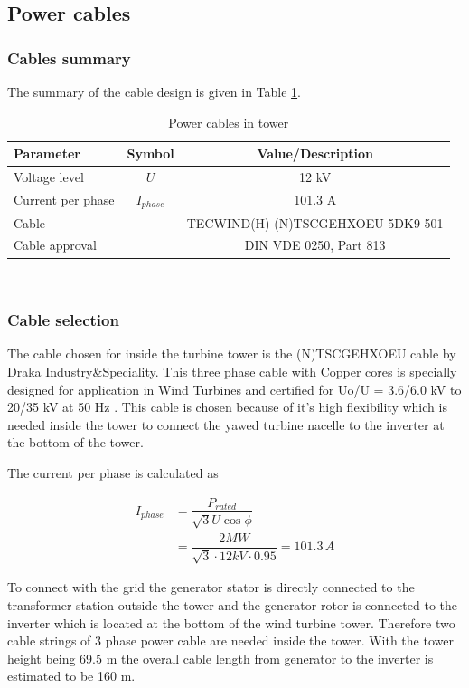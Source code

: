\subsection{Power cables}

\subsubsection{Cables summary}
The summary of the cable design is given in Table \ref{tab:power_cables}.

\begin{table}[h]
\centering
\caption{Power cables in tower}
\label{tab:power_cables}
\begin{tabular}{ |l|c|c|} 
\hline
\textbf{Parameter} & Symbol & \textbf{Value/Description}  \\ 
\hline
Voltage level & $U$ & 12 kV\\
\hline
Current per phase & $I_{phase}$ & 101.3 A\\
\hline
Cable & & TECWIND(H) (N)TSCGEHXOEU 5DK9 501  \\
\hline
Cable approval & & DIN VDE 0250, Part 813 \\
\hline
\end{tabular} \\
\end{table}

\subsubsection{Cable selection}

The cable chosen for inside the turbine tower is the (N)TSCGEHXOEU cable by Draka Industry\&Speciality. This three phase cable with Copper cores is specially designed for application in Wind Turbines and certified for  Uo/U = 3.6/6.0 kV to 20/35 kV at 50 Hz \cite{Draka}. This cable is chosen because of it's high flexibility which is needed inside the tower to connect the yawed turbine nacelle to the inverter at the bottom of the tower.

The current per phase is calculated as

\begin{align}
    I_{phase} &= \dfrac{P_{rated}}{\sqrt{3}U \cos \phi} \\
    &= \dfrac{2 MW}{\sqrt{3} \cdot 12 kV \cdot 0.95} = 101.3\,A \nonumber
\end{align}

To connect with the grid the generator stator is directly connected to the transformer station outside the tower and the generator rotor is connected to the inverter which is located at the bottom of the wind turbine tower. Therefore two cable strings of 3 phase power cable are needed inside the tower. With the tower height being 69.5 m the overall cable length from generator to the inverter is estimated to be 160 m. 

